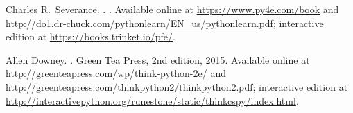 \documentclass[11pt,a4paper]{article}
\begin{document}
%

\begin{thebibliography}{1}

Charles R.\ Severance.
.
.
\newblock Available online at \url{https://www.py4e.com/book} and
 \url{http://do1.dr-chuck.com/pythonlearn/EN_us/pythonlearn.pdf}; interactive edition at
 \url{https://books.trinket.io/pfe/}.

Allen Downey.
.
\newblock Green Tea Press, 2nd edition, 2015.
\newblock Available online at \url{http://greenteapress.com/wp/think-python-2e/} and
 \url{http://greenteapress.com/thinkpython2/thinkpython2.pdf}; interactive edition at
 \url{http://interactivepython.org/runestone/static/thinkcspy/index.html}.

\end{thebibliography}
\end{document}
